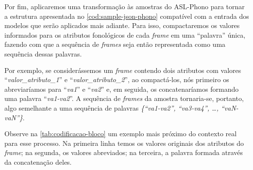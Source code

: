 Por fim, aplicaremos uma transformação às amostras do ASL-Phono para tornar a estrutura apresentada no \autoref{cod:sample-json-phono} compatível com a entrada dos modelos que serão aplicados mais adiante.
Para isso, compactaremos os valores informados para os atributos fonológicos de cada \textit{frame} em uma ``palavra'' única, fazendo com que a sequência de \textit{frames} seja então representada como uma sequência dessas palavras.

Por exemplo, se considerássemos um \textit{frame} contendo dois atributos com valores ``\textit{valor\_atributo\_1}'' e ``\textit{valor\_atributo\_2}'', ao compactá-los, nós primeiro os abreviaríamos para ``\textit{va1}'' e ``\textit{va2}'' e, em seguida, os concatenaríamos formando uma palavra ``\textit{va1-va2}''.  A sequência de \textit{frames} da amostra tornaria-se, portanto, algo semelhante a uma sequência de palavras \textit{\{``va1-va2'', ``va3-va4'', \dots, ``vaN-vaN''\}}.

Observe na \autoref{tab:codificacao-bloco} um exemplo mais próximo do contexto real para esse processo. Na primeira linha temos os valores originais dos atributos do \textit{frame}; na segunda, os valores abreviados; na terceira, a palavra formada através da concatenação deles.




